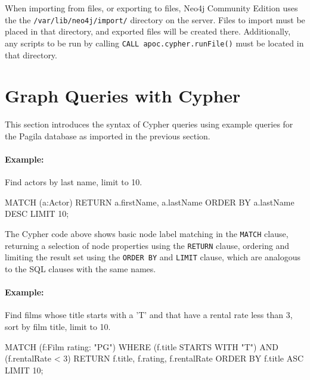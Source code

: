\begin{tcolorbox}[colback=alert]
When importing from files, or exporting to files, Neo4j Community Edition uses the the \texttt{/var/lib/neo4j/import/} directory on the server. Files to import must be placed in that directory, and exported files will be created there. Additionally, any scripts to be run by calling \texttt{CALL apoc.cypher.runFile()} must be located in that directory.
\end{tcolorbox}

\section{Graph Queries with Cypher}

This section introduces the syntax of Cypher queries using example queries for the Pagila database as imported in the previous section.

\paragraph*{Example:}
Find actors by last name, limit to 10.

\begin{samepage}
\begin{cyphercode}
MATCH (a:Actor) 
RETURN a.firstName, a.lastName
ORDER BY a.lastName DESC
LIMIT 10;
\end{cyphercode}
\end{samepage}

The Cypher code above shows basic node label matching in the \texttt{MATCH} clause, returning a selection of node properties using the \texttt{RETURN} clause, ordering and limiting the result set using the \texttt{ORDER BY} and \texttt{LIMIT} clause, which are analogous to the SQL clauses with the same names.

\paragraph*{Example:} Find films whose title starts with a 'T' and that have a rental rate less than 3, sort by film title, limit to 10.

\begin{samepage}
\begin{cyphercode}
MATCH (f:Film {rating: "PG"})
WHERE (f.title STARTS WITH "T") AND (f.rentalRate < 3)
RETURN f.title, f.rating, f.rentalRate
ORDER BY f.title ASC LIMIT 10;
\end{cyphercode}
\end{samepage}

